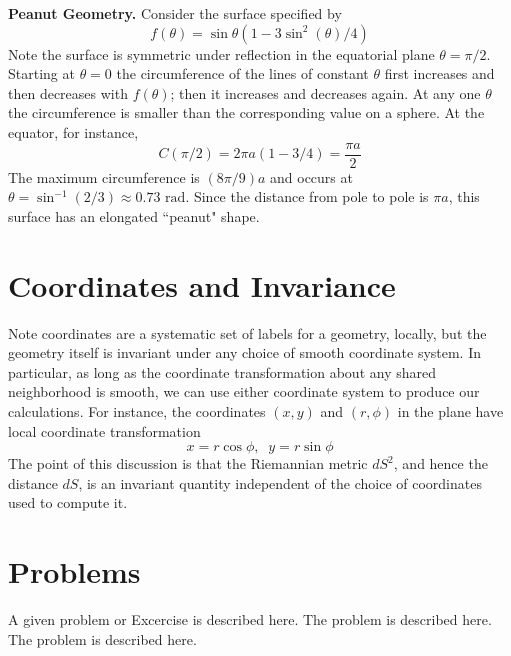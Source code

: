 \begin{eg}
    \textbf{Peanut Geometry.} Consider the surface specified by $$f(\theta) = \sin\theta(1-3\sin^2(\theta)/4)$$
    Note the surface is symmetric under reflection in the equatorial plane $\theta = \pi/2$. Starting at $\theta = 0$ the circumference of the lines of constant $\theta$ first increases and then decreases with $f(\theta)$; then it increases and decreases again. At any one $\theta$ the circumference is smaller than the corresponding value on a sphere. At the equator, for instance, $$C(\pi/2) = 2\pi a(1-3/4) = \frac{\pi a}{2}$$
    The maximum circumference is $(8\pi/9)a$ and occurs at $\theta = \sin^{-1}(2/3) \approx 0.73\text{ rad}$. Since the distance from pole to pole is $\pi a$, this surface has an elongated ``peanut" shape.
\end{eg}

\section{Coordinates and Invariance}
\label{sec:Coord}

Note coordinates are a systematic set of labels for a geometry, locally, but the geometry itself is invariant under any choice of smooth coordinate system. In particular, as long as the coordinate transformation about any shared neighborhood is smooth, we can use either coordinate system to produce our calculations. For instance, the coordinates $(x,y)$ and $(r,\phi)$ in the plane have local coordinate transformation $$x = r\cos \phi,\;\;y = r\sin\phi$$
The point of this discussion is that the Riemannian metric $dS^2$, and hence the distance $dS$, is an invariant quantity independent of the choice of coordinates used to compute it.


%
%
%


\section*{Problems}
%
\begin{prob}
\label{prob1}
A given problem or Excercise is described here. The
problem is described here. The problem is described here.
\end{prob}



